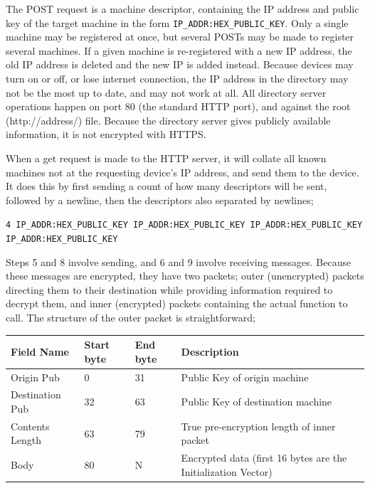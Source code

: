 \documentclass{article}
\begin{document}
The POST request is a machine descriptor, containing the IP address and public key of the target machine in the form \texttt{IP\_ADDR:HEX\_PUBLIC\_KEY}. Only a single machine may be registered at once, but several POSTs may be made to register several machines. If a given machine is re-registered with a new IP address, the old IP address is deleted and the new IP is added instead. Because devices may turn on or off, or lose internet connection, the IP address in the directory may not be the most up to date, and may not work at all. All directory server operations happen on port 80 (the standard HTTP port), and against the root (http://address/) file. Because the directory server gives publicly available information, it is not encrypted with HTTPS.

When a get request is made to the HTTP server, it will collate all known machines not at the requesting device's IP address, and send them to the device. It does this by first sending a count of how many descriptors will be sent, followed by a newline, then the descriptors also separated by newlines;

\texttt{4 \newline
IP\_ADDR:HEX\_PUBLIC\_KEY \newline
IP\_ADDR:HEX\_PUBLIC\_KEY \newline
IP\_ADDR:HEX\_PUBLIC\_KEY \newline
IP\_ADDR:HEX\_PUBLIC\_KEY
}

Steps 5 and 8 involve sending, and 6 and 9 involve receiving messages. Because these messages are encrypted, they have two packets; outer (unencrypted) packets directing them to their destination while providing information required to decrypt them, and inner (encrypted) packets containing the actual function to call. The structure of the outer packet is straightforward;

\begin{table}[H]
\begin{tabular}{|p{25mm}|l|l|p{45mm}|}
\hline
\textbf{Field Name}	& \textbf{Start byte}	& \textbf{End byte}		& \textbf{Description} \\ \hline
Origin Pub					& 0									& 31							& Public Key of origin machine \\ \hline
Destination Pub			& 32								& 63							& Public Key of destination machine \\ \hline
Contents Length			& 63								& 79							& True pre-encryption length of inner packet \\ \hline
Body								& 80								& N								& Encrypted data (first 16 bytes are the Initialization Vector) \\ \hline
\end{tabular}
\end{table}
\end{document}
